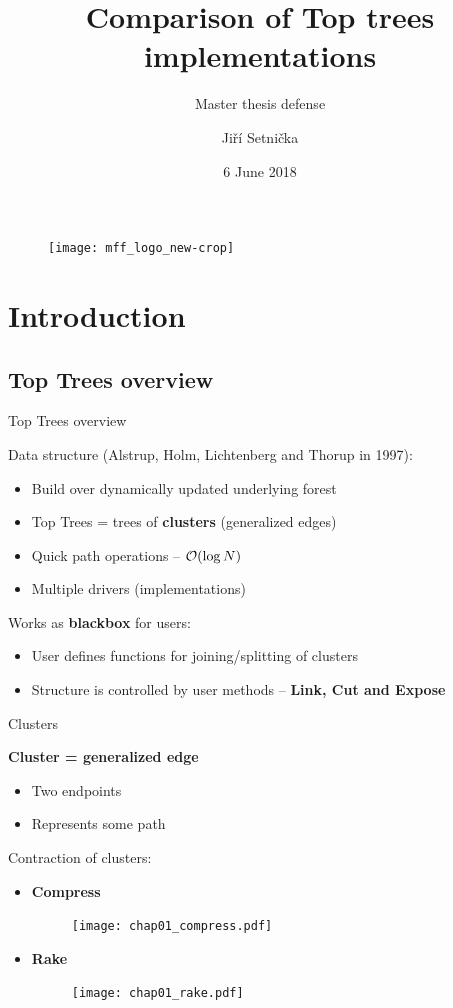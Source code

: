 \documentclass{beamer}				%
\title{Comparison of Top trees implementations}
\subtitle{Master thesis defense}
\author{Jiří Setnička}
\institute[KAM]{Department of Applied Mathematics}
\date{6 June 2018}
\begin{document}
\def\O{{\cal O}}

\begin{frame}[plain]
\vfill
\begin{figure}
	\texttt{[image: mff\_logo\_new-crop]}
\end{figure}
\titlepage
\end{frame}


\section{Introduction}
\subsection{Top Trees overview}

\begin{frame}{Top Trees overview}

Data structure (Alstrup, Holm, Lichtenberg and Thorup in 1997):
\begin{itemize}
	\item Build over dynamically updated underlying forest
	\item Top Trees = trees of {\bf clusters} (generalized edges)
	\item Quick path operations -- $\O(\log N)$
	\pause\item Multiple drivers (implementations)
\end{itemize}

\bigskip
\pause Works as {\bf blackbox} for users:
\begin{itemize}
	\item User defines functions for joining/splitting of clusters
	\item Structure is controlled by user methods -- {\bf Link, Cut and Expose}
\end{itemize}
\end{frame}


\begin{frame}{Clusters}

{\bf Cluster = generalized edge}
\begin{itemize}
\item Two endpoints
\item Represents some path
\end{itemize}

\bigskip\pause
Contraction of clusters:
\begin{itemize}
\item {\bf Compress}
	\begin{figure}[h]
	\centering
	\texttt{[image: chap01\_compress.pdf]}
	\end{figure}
\item {\bf Rake}
	\begin{figure}[h]
	\centering
	\texttt{[image: chap01\_rake.pdf]}
	\end{figure}
\end{itemize}

\end{frame}
\end{document}
